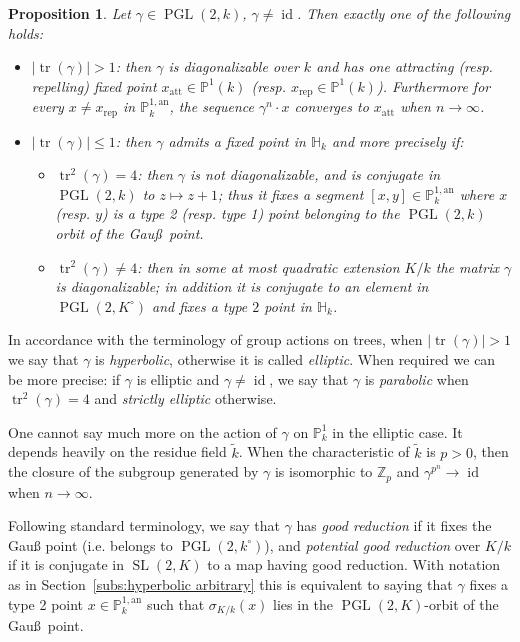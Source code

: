 \documentclass[11pt]{article}
\newtheorem{prop}[theo]{Proposition}
\theoremstyle{definition}
\numberwithin{equation}{section}
\numberwithin{figure}{section}
\numberwithin{table}{section}
\DeclareMathOperator{\tr}{tr}
\DeclareMathOperator{\id}{id}
\DeclareMathOperator{\SL}{SL}
\DeclareMathOperator{\PGL}{PGL}
\newcommand{\hh}{\mathbb{H}}
\newcommand{\Z}{{\mathbb Z}}
\newcommand{\an}{\mathrm{an}}
\newcommand{\PP}{\mathbb{P}}
\newcommand{\att}{\mathrm{att}}
\newcommand{\rep}{\mathrm{rep}}
\begin{document}
\begin{prop}\label{prop:claselt}
Let $\gamma\in \PGL(2,k)$, $\gamma\neq \id$. Then exactly one of the following holds:
\begin{itemize}
\item $\mathopen{|}\tr(\gamma)| >1$: then $\gamma$ is diagonalizable over $k$ and has one attracting (resp. repelling) fixed point $x_\att \in \PP^1(k)$ (resp. $x_\rep \in \PP^1(k)$). Furthermore for every $x\neq x_\rep$ in $\PP^{1,\an}_k$, the sequence $\gamma^n\cdot x $ converges to $ x_\att$ when $n\to\infty$.
\item $\mathopen{|}\tr(\gamma)| \leq 1$: then $\gamma$ admits a fixed point in $\hh_k$ and more precisely if:
\begin{itemize}
\item $\tr^2(\gamma) =4$: then $\gamma$ is not diagonalizable, and is conjugate in $\PGL(2,k)$ to $z\mapsto z+1$; thus it fixes a segment $[x,y] \in \PP^{1,\an}_k$ where $x$ (resp. $y$) is a type 2 (resp. type 1) point belonging to the $\PGL(2,k)$ orbit of the Gau\ss\ point.
\item $\tr^2(\gamma) \neq 4$: then in some at most quadratic extension $K/k$ the matrix $\gamma$ is diagonalizable; in addition it is conjugate to an element in $\PGL(2,K^\circ)$ and fixes a type $2$ point in $\hh_k$.
\end{itemize}
\end{itemize}
\end{prop}

In accordance with the terminology of group actions on trees, when $\mathopen{|}\tr(\gamma)| >1$ we say that $\gamma$ is \emph{hyperbolic}, otherwise it is called \emph{elliptic}. When required we can be more precise: if $\gamma$ is elliptic and $\gamma\neq \id$, we say that $\gamma$ is \emph{parabolic} when $\tr^2(\gamma) =4$ and \emph{strictly elliptic} otherwise.


One cannot say much more on the action of $\gamma$ on $\PP^1_k$ in the elliptic case. It depends heavily on the residue field $\widetilde{k}$. When the characteristic of $\widetilde{k}$ is $p>0$, then the closure of the subgroup generated by $\gamma$ is isomorphic to $\Z_p$ and $\gamma^{p^n} \to \id$ when $n\to\infty$.


Following standard terminology, we say that $\gamma$ has \emph{good reduction} if it fixes the Gau{\ss} point (i.e. belongs to $\PGL(2,k^\circ)$), and \emph{potential good reduction} over $K/k$ if it is conjugate in $\SL(2,K)$ to a map having good reduction. With notation as in Section~\ref{subs:hyperbolic arbitrary} this is equivalent to saying that $\gamma$ fixes a type 2 point $x\in \PP^{1,\an}_k$ such that $\sigma_{K/k}(x)$ lies in the $\PGL(2,K)$-orbit of the Gau\ss\ point.
\end{document}
